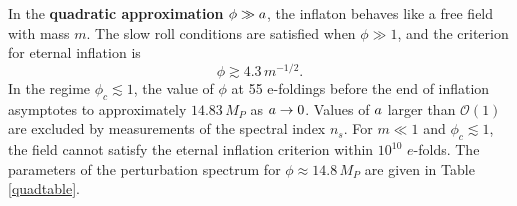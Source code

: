 In the \textbf{quadratic approximation} $\phi \gg a$, the inflaton behaves like a free field with mass $m$.  The slow roll conditions are satisfied when $\phi \gg 1$, and the criterion for eternal inflation is \[ \phi \gtrsim 4.3 \, m^{-1/2}.\] %
In the regime $\phi_c \lesssim 1$, the value of $\phi$ at 55 e-foldings before the end of inflation asymptotes to approximately $14.83 \, M_P$ as $a \to 0$.  Values of $a$ larger than $\mathcal O(1)$ are excluded by measurements of the spectral index $n_s$.
For $m \ll 1$ and $\phi_c \lesssim 1$, the field cannot satisfy the eternal inflation criterion within $10^{10}$ $e$-folds.
The parameters of the perturbation spectrum for $\phi \approx 14.8 \, M_P$ are given in Table \ref{quadtable}.


